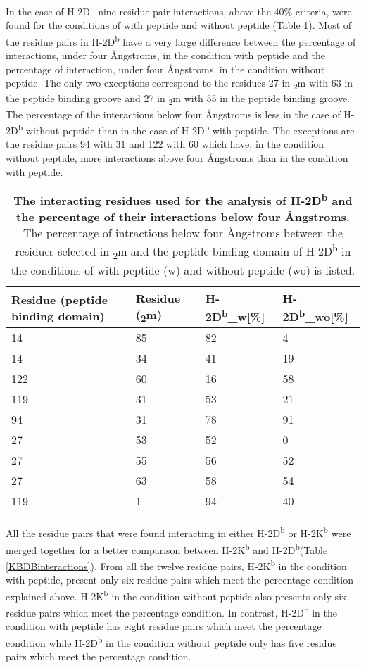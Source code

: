 \documentclass[11pt,twocolumn]{article}
\newcommand{\db}{H-2D\textsuperscript{b}\xspace}
\newcommand{\dbw}{H-2D\textsuperscript{b}\_w\xspace}
\newcommand{\dbwo}{H-2D\textsuperscript{b}\_wo\xspace}
\newcommand{\kb}{H-2K\textsuperscript{b}\xspace}
\newcommand{\angstr}{{\AA}ngstroms\xspace}
\newcommand{\btm}{\textbeta\textsubscript{2}m\xspace}
\begin{document}
In the case of \db nine residue pair interactions, above the 40\% criteria, were found for the conditions of with peptide and without peptide (Table \ref{DBinteractions}). Most of the residue pairs in \db have a very large difference between the percentage of interactions, under four \angstr,  in the condition with peptide and the percentage of interaction, under four \angstr, in the condition without peptide.    
The only two exceptions correspond to the residues 27 in \btm with 63 in the peptide binding groove and 27 in \btm with 55 in the peptide binding groove. The percentage of the interactions below four \angstr is less in the case of \db without peptide than in the case of \db with peptide. The exceptions are the residue pairs 94 with 31 and 122 with 60 which have, in the condition without peptide, more interactions above four \angstr than in the condition with peptide.  
 
 
 
\begin{table}[H]
\caption{\textbf{The interacting residues used for the analysis of \db and the percentage of their interactions below four \angstr. } The percentage of intractions below four \angstr between the residues selected in \btm and the peptide binding domain of \db in the conditions of with peptide (w) and without peptide (wo) is listed.}
\label{DBinteractions}
\begin{tabularx}{\linewidth}{|X|X|X|X|}  \hline
Residue (peptide binding domain)&Residue (\btm)&\dbw [\%]&\dbwo [\%]\\ \hline
14&85&82&4\\ \hline
14&34&41&19\\ \hline
122&60&16&58\\ \hline
119&31&53&21\\ \hline
94&31&78&91\\ \hline
27&53&52&0\\ \hline
27&55&56&52\\ \hline
27&63&58&54\\ \hline
119&1&94&40\\ \hline
\end{tabularx}
\end{table}


All the residue pairs that were found interacting in either \db or \kb were merged together for a better comparison between \kb and \db  (Table \ref{KBDBinteractions}). From all the twelve residue pairs, \kb in the condition with peptide, present only six residue pairs which meet the percentage condition explained above. \kb in the condition without peptide also presents only six residue pairs which meet the percentage condition. In contrast, \db in the condition with peptide has eight residue pairs which meet the percentage condition while \db in the condition without peptide only has five residue pairs which meet the percentage condition. 
\end{document}
